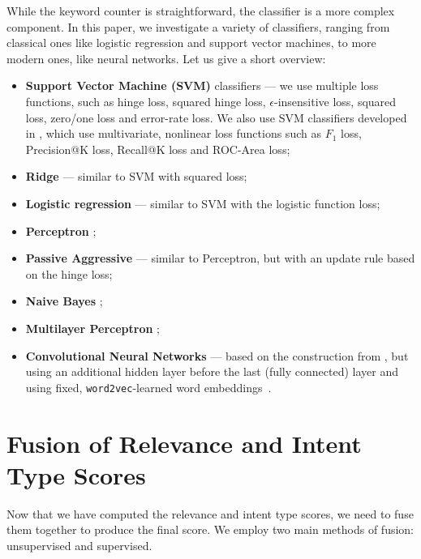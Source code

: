 While the keyword counter is straightforward, the classifier is a more complex component. In this paper, we investigate
a variety of classifiers, ranging from classical ones like logistic regression and support vector machines, to more modern
ones, like neural networks. Let us give a short overview:

\begin{itemize}
 \item \textbf{Support Vector Machine (SVM)} classifiers ---
we use multiple loss functions, such as hinge loss,
squared hinge loss, $\epsilon$-insensitive loss, squared loss, zero/one loss and error-rate loss.
We also use SVM classifiers developed in \cite{svmperf3, svmperf1, svmperf2}, which use multivariate,
nonlinear loss functions such as $F_1$ loss, Precision@K loss, Recall@K loss and ROC-Area loss;
\item \textbf{Ridge} \cite{scikit} --- similar to SVM with squared loss;
\item \textbf{Logistic regression} \cite{scikit} --- similar to SVM with the logistic function loss;
\item \textbf{Perceptron} \cite{scikit};
\item \textbf{Passive Aggressive} \cite{passiveAggr} --- similar to Perceptron, but with an update rule
  based on the hinge loss;
\item \textbf{Naive Bayes} \cite{ir-intro};
\item \textbf{Multilayer Perceptron} \cite{scikit};
\item \textbf{Convolutional Neural Networks} --- based on the construction from \cite{cnn}, but using an additional
hidden layer before the last (fully connected) layer and using fixed, \texttt{word2vec}-learned word embeddings~\cite{w2v}.
\end{itemize}

\section{Fusion of Relevance and Intent Type Scores}\label{fusion-theory}
Now that we have computed the relevance and intent type scores, we need to fuse them together to produce the final score.
We employ two main methods of fusion: unsupervised and supervised.

